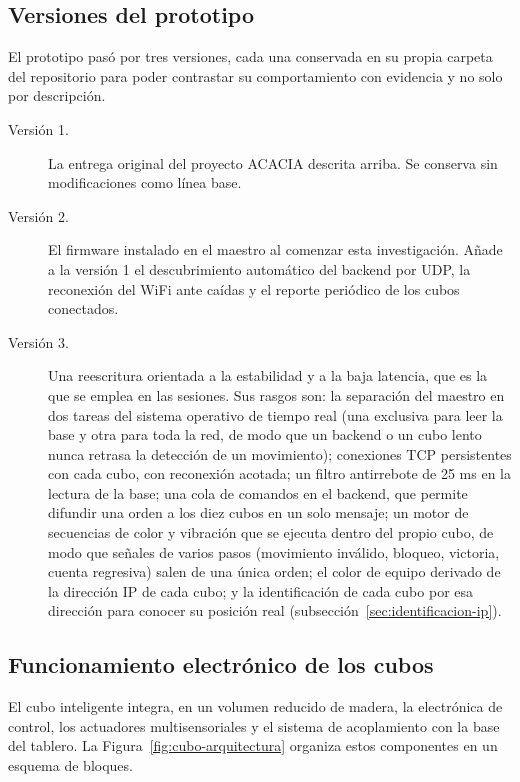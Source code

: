 \documentclass{book}
\begin{document}

\subsection{Versiones del prototipo}
\label{sec:versiones}

El prototipo pasó por tres versiones, cada una conservada en su propia carpeta del repositorio para poder contrastar su comportamiento con evidencia y no solo por descripción.

\begin{description}
    \item[Versión 1.] La entrega original del proyecto ACACIA descrita arriba. Se conserva sin modificaciones como línea base.
    \item[Versión 2.] El firmware instalado en el maestro al comenzar esta investigación. Añade a la versión 1 el descubrimiento automático del backend por UDP, la reconexión del WiFi ante caídas y el reporte periódico de los cubos conectados.
    \item[Versión 3.] Una reescritura orientada a la estabilidad y a la baja latencia, que es la que se emplea en las sesiones. Sus rasgos son: la separación del maestro en dos tareas del sistema operativo de tiempo real (una exclusiva para leer la base y otra para toda la red, de modo que un backend o un cubo lento nunca retrasa la detección de un movimiento); conexiones TCP persistentes con cada cubo, con reconexión acotada; un filtro antirrebote de 25 ms en la lectura de la base; una cola de comandos en el backend, que permite difundir una orden a los diez cubos en un solo mensaje; un motor de secuencias de color y vibración que se ejecuta dentro del propio cubo, de modo que señales de varios pasos (movimiento inválido, bloqueo, victoria, cuenta regresiva) salen de una única orden; el color de equipo derivado de la dirección IP de cada cubo; y la identificación de cada cubo por esa dirección para conocer su posición real (subsección~\ref{sec:identificacion-ip}).
\end{description}

\subsection{Funcionamiento electrónico de los cubos}

El cubo inteligente integra, en un volumen reducido de madera, la
electrónica de control, los actuadores multisensoriales y el sistema
de acoplamiento con la base del tablero. La Figura~\ref{fig:cubo-arquitectura}
organiza estos componentes en un esquema de bloques.
\end{document}
